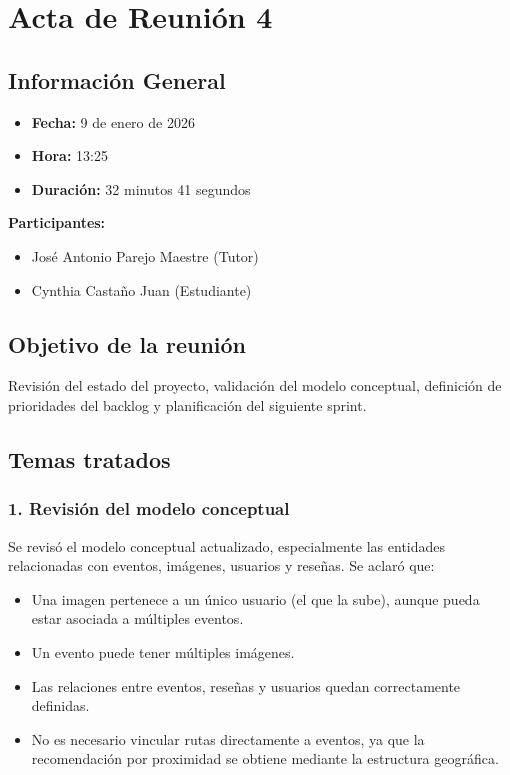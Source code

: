 \newpage

\section*{Acta de Reunión 4}

\subsection*{Información General}
\begin{itemize}
    \item \textbf{Fecha:} 9 de enero de 2026
    \item \textbf{Hora:} 13:25
    \item \textbf{Duración:} 32 minutos 41 segundos
\end{itemize}

\textbf{Participantes:}
\begin{itemize}
    \item José Antonio Parejo Maestre (Tutor)
    \item Cynthia Castaño Juan (Estudiante)
\end{itemize}

\subsection*{Objetivo de la reunión}
Revisión del estado del proyecto, validación del modelo conceptual, definición de prioridades del backlog y planificación del siguiente sprint.

\subsection*{Temas tratados}

\subsubsection*{1. Revisión del modelo conceptual}
Se revisó el modelo conceptual actualizado, especialmente las entidades relacionadas con eventos, imágenes, usuarios y reseñas. Se aclaró que:

\begin{itemize}
    \item Una imagen pertenece a un único usuario (el que la sube), aunque pueda estar asociada a múltiples eventos.
    \item Un evento puede tener múltiples imágenes.
    \item Las relaciones entre eventos, reseñas y usuarios quedan correctamente definidas.
    \item No es necesario vincular rutas directamente a eventos, ya que la recomendación por proximidad se obtiene mediante la estructura geográfica.
\end{itemize}

